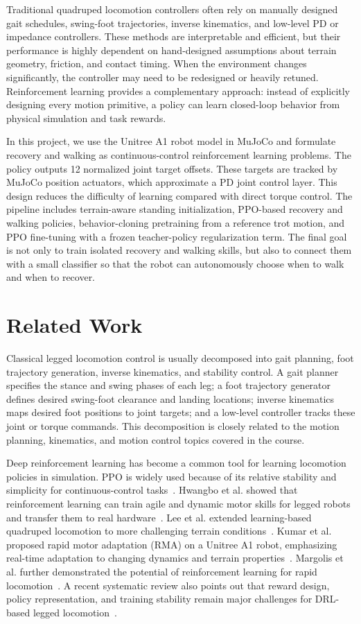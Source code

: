 \documentclass[conference]{IEEEtran}
\begin{document}
Traditional quadruped locomotion controllers often rely on manually designed gait schedules, swing-foot trajectories, inverse kinematics, and low-level PD or impedance controllers. These methods are interpretable and efficient, but their performance is highly dependent on hand-designed assumptions about terrain geometry, friction, and contact timing. When the environment changes significantly, the controller may need to be redesigned or heavily retuned. Reinforcement learning provides a complementary approach: instead of explicitly designing every motion primitive, a policy can learn closed-loop behavior from physical simulation and task rewards.

In this project, we use the Unitree A1 robot model in MuJoCo and formulate recovery and walking as continuous-control reinforcement learning problems. The policy outputs 12 normalized joint target offsets. These targets are tracked by MuJoCo position actuators, which approximate a PD joint control layer. This design reduces the difficulty of learning compared with direct torque control. The pipeline includes terrain-aware standing initialization, PPO-based recovery and walking policies, behavior-cloning pretraining from a reference trot motion, and PPO fine-tuning with a frozen teacher-policy regularization term. The final goal is not only to train isolated recovery and walking skills, but also to connect them with a small classifier so that the robot can autonomously choose when to walk and when to recover.

\section{Related Work}
Classical legged locomotion control is usually decomposed into gait planning, foot trajectory generation, inverse kinematics, and stability control. A gait planner specifies the stance and swing phases of each leg; a foot trajectory generator defines desired swing-foot clearance and landing locations; inverse kinematics maps desired foot positions to joint targets; and a low-level controller tracks these joint or torque commands. This decomposition is closely related to the motion planning, kinematics, and motion control topics covered in the course.

Deep reinforcement learning has become a common tool for learning locomotion policies in simulation. PPO is widely used because of its relative stability and simplicity for continuous-control tasks~\cite{ppo}. Hwangbo et al. showed that reinforcement learning can train agile and dynamic motor skills for legged robots and transfer them to real hardware~\cite{hwangbo2019learning}. Lee et al. extended learning-based quadruped locomotion to more challenging terrain conditions~\cite{lee2020learning}. Kumar et al. proposed rapid motor adaptation (RMA) on a Unitree A1 robot, emphasizing real-time adaptation to changing dynamics and terrain properties~\cite{kumar2021rma}. Margolis et al. further demonstrated the potential of reinforcement learning for rapid locomotion~\cite{margolis2022rapid}. A recent systematic review also points out that reward design, policy representation, and training stability remain major challenges for DRL-based legged locomotion~\cite{sun2024systematic}.
\end{document}
